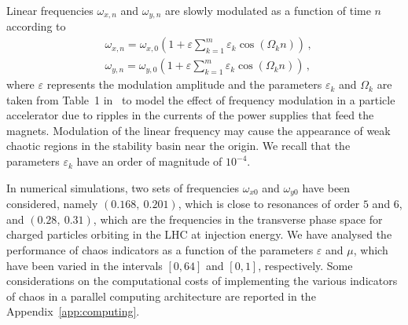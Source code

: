 Linear frequencies $\omega_{x, n}$ and $\omega_{y, n}$ are slowly modulated as a function of time $n$ according to
\begin{equation}
    \begin{aligned}
    &\omega_{x, n}=\omega_{x, 0}\left(1+\varepsilon \sum_{k=1}^{m} \varepsilon_{k} \cos \left(\Omega_{k} n\right)\right) \,, \\
    &\omega_{y, n}=\omega_{y, 0}\left(1+\varepsilon \sum_{k=1}^{m} \varepsilon_{k} \cos \left(\Omega_{k} n\right)\right) \,,
    \end{aligned}
\end{equation}
where $\varepsilon$ represents the modulation amplitude and the parameters $\varepsilon_k$ and $\Omega_k$ are taken from Table~1 in~\cite{invlog} to model the effect of frequency modulation in a particle accelerator due to ripples in the currents of the power supplies that feed the magnets. Modulation of the linear frequency may cause the appearance of weak chaotic regions in the stability basin near the origin. 
We recall that the parameters $\varepsilon_k$ have an order of magnitude of $10^{-4}$.

In numerical simulations, two sets of frequencies $\omega_{x0}$ and $\omega_{y0}$ have been considered, namely $(0.168,\ 0.201)$, which is close to resonances of order $5$ and $6$, and $(0.28,\ 0.31)$, which are the frequencies in the transverse phase space for charged particles orbiting in the LHC at injection energy.
We have analysed the performance of chaos indicators as a function of the parameters $\varepsilon$ and $\mu$, which have been varied in the intervals $[0,64]$ and $[0,1]$, respectively. Some considerations on the computational costs of implementing the various indicators of chaos in a parallel computing architecture are reported in the Appendix~\ref{app:computing}. 


